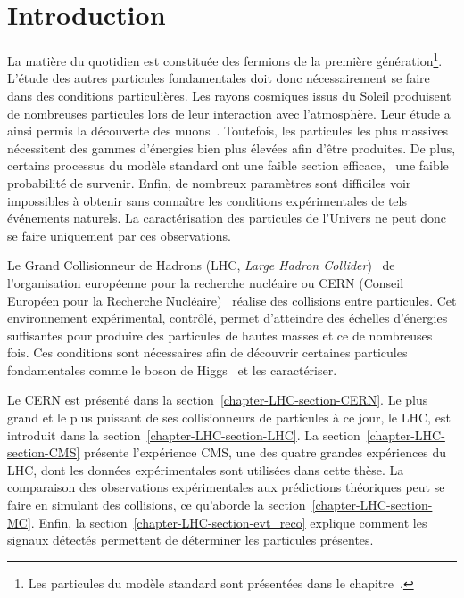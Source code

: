 \section{Introduction}\label{chapter-LHC-section-introduction}
La matière \og du quotidien \fg{} est constituée des fermions de la première génération\footnote{Les particules du modèle standard sont présentées dans le chapitre~.}.
L'étude des autres particules fondamentales doit donc nécessairement se faire dans des conditions particulières.
Les rayons cosmiques issus du Soleil produisent de nombreuses particules lors de leur interaction avec l'atmosphère.
Leur étude a ainsi permis la découverte des muons~\cite{muon_discovery}.
Toutefois, les particules les plus massives nécessitent des gammes d'énergies bien plus élevées afin d'être produites.
De plus, certains processus du modèle standard ont une faible section efficace, \ie\ une faible probabilité de survenir.
Enfin, de nombreux paramètres sont difficiles voir impossibles à obtenir sans connaître les conditions expérimentales de tels événements naturels.
La caractérisation des particules de l'Univers ne peut donc se faire uniquement par ces observations.
\par Le Grand Collisionneur de Hadrons (LHC, \emph{Large Hadron Collider})~\cite{LHC_paper1,LHC_paper2,LHC_paper3} de l'organisation européenne pour la recherche nucléaire ou CERN (Conseil Européen pour la Recherche Nucléaire)~\cite{CERN_website} réalise des collisions entre particules.
Cet environnement expérimental, contrôlé, permet d'atteindre des échelles d'énergies suffisantes pour produire des particules de hautes masses et ce de nombreuses fois.
Ces conditions sont nécessaires afin de découvrir certaines particules fondamentales comme le boson de Higgs~\cite{ATLAS_Higgs_discovery,CMS_Higgs_discovery,CMS_Higgs_discovery_2013,ATLAS-CMS-Higgs_combined_1,ATLAS-CMS-Higgs_combined_2} et les caractériser.
\par Le CERN est présenté dans la section~\ref{chapter-LHC-section-CERN}.
Le plus grand et le plus puissant de ses collisionneurs de particules à ce jour, le LHC, est introduit dans la section~\ref{chapter-LHC-section-LHC}.
La section~\ref{chapter-LHC-section-CMS} présente l'expérience CMS, une des quatre grandes expériences du LHC, dont les données expérimentales sont utilisées dans cette thèse.
La comparaison des observations expérimentales aux prédictions théoriques peut se faire en simulant des collisions, ce qu'aborde la section~\ref{chapter-LHC-section-MC}.
Enfin, la section~\ref{chapter-LHC-section-evt_reco} explique comment les signaux détectés permettent de déterminer les particules présentes.